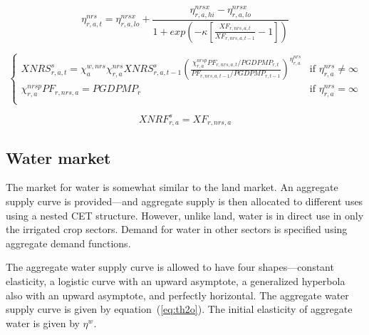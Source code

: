 \documentclass[11pt,letterpaper]{report}
\begin{document}
\begin{equation}
\label{eq:etanrs}
\eta^{\mathit{nrs}}_{r,a,t} =
   \eta^{\mathit{nrsx}}_{r,a,\mathit{lo}}
+  \frac {\eta^{\mathit{nrsx}}_{r,a,\mathit{hi}} -
      \eta^{\mathit{nrsx}}_{r,a,\mathit{lo}}}
      {1+exp\left(
         -\kappa
         \left[
            \displaystyle \frac{\mathit{XF}_{r,\mathit{nrs},a,t}}
            {\mathit{XF}_{r,\mathit{nrs},a,t-1}} - 1
         \right]
      \right)}
\end{equation}

\begin{equation}
\label{eq:xnrss}
\begin{cases}
   \displaystyle \mathit{XNRS}^s_{r,a,t} =
      \chi^{w,\mathit{nrs}}_a \chi^{\mathit{nrs}}_{r,a}
         \mathit{XNRS}^s_{r,a,t-1}
      \left( \frac {\chi^{\mathit{nrsp}}_{r,a}
         \mathit{PF}_{r,\mathit{nrs},a,t} / \mathit{PGDPMP}_{r,t}}
         {\mathit{PF}_{r,\mathit{nrs},a,t-1} / \mathit{PGDPMP}_{r,t-1}}
      \right)^{\eta^{\mathit{nrs}}_{r,a}}
   & \textrm{if } \eta^{\mathit{nrs}}_{r,a} \ne \infty \\
   \displaystyle \chi^{\mathit{nrsp}}_{r,a} \mathit{PF}_{r,\mathit{nrs},a} =
      \mathit{PGDPMP}_r
   & \textrm{if } \eta^{\mathit{nrs}}_{r,a} = \infty \\
\end{cases}
\end{equation}

\begin{equation}
\label{eq:pnrs}
\mathit{XNRF}^s_{r,a} = \mathit{XF}_{r,\mathit{nrs},a}
\end{equation}

\subsection{Water market}

The market for water is somewhat similar to the land market. An aggregate supply
curve is provided---and aggregate supply is then allocated to different uses
using a nested CET structure. However, unlike land, water is in direct use in
only the irrigated crop sectors. Demand for water in other sectors is specified
using aggregate demand functions.

The aggregate water supply curve is allowed to have four shapes---constant
elasticity, a logistic curve with an upward asymptote, a generalized hyperbola
also with an upward asymptote, and perfectly horizontal. The aggregate water
supply curve is given by equation~(\ref{eq:th2o}). The initial elasticity of
aggregate water is given by $\eta^w$.
\end{document}

